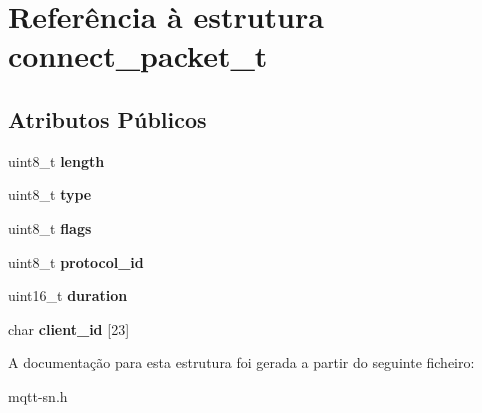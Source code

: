 \hypertarget{structconnect__packet__t}{\section{Referência à estrutura connect\+\_\+packet\+\_\+t}
\label{structconnect__packet__t}
}
\subsection*{Atributos Públicos}
\begin{DoxyCompactItemize}
\item 
\hypertarget{structconnect__packet__t_a51228edf71d2c3b0b8d049beea278ad7}{uint8\+\_\+t {\bfseries length}}\label{structconnect__packet__t_a51228edf71d2c3b0b8d049beea278ad7}

\item 
\hypertarget{structconnect__packet__t_a082de55b8377052e1957ff8bad186037}{uint8\+\_\+t {\bfseries type}}\label{structconnect__packet__t_a082de55b8377052e1957ff8bad186037}

\item 
\hypertarget{structconnect__packet__t_a91eb3d6559284c3385ebec9bfeca0ec6}{uint8\+\_\+t {\bfseries flags}}\label{structconnect__packet__t_a91eb3d6559284c3385ebec9bfeca0ec6}

\item 
\hypertarget{structconnect__packet__t_aea7d723928bde83abf3274c4658f6a16}{uint8\+\_\+t {\bfseries protocol\+\_\+id}}\label{structconnect__packet__t_aea7d723928bde83abf3274c4658f6a16}

\item 
\hypertarget{structconnect__packet__t_a274e305934afe0330abdc28131697003}{uint16\+\_\+t {\bfseries duration}}\label{structconnect__packet__t_a274e305934afe0330abdc28131697003}

\item 
\hypertarget{structconnect__packet__t_a141fbc06968f67ba017ce7672a93d893}{char {\bfseries client\+\_\+id} \mbox{[}23\mbox{]}}\label{structconnect__packet__t_a141fbc06968f67ba017ce7672a93d893}

\end{DoxyCompactItemize}


A documentação para esta estrutura foi gerada a partir do seguinte ficheiro\+:\begin{DoxyCompactItemize}
\item 
mqtt-\/sn.\+h\end{DoxyCompactItemize}
